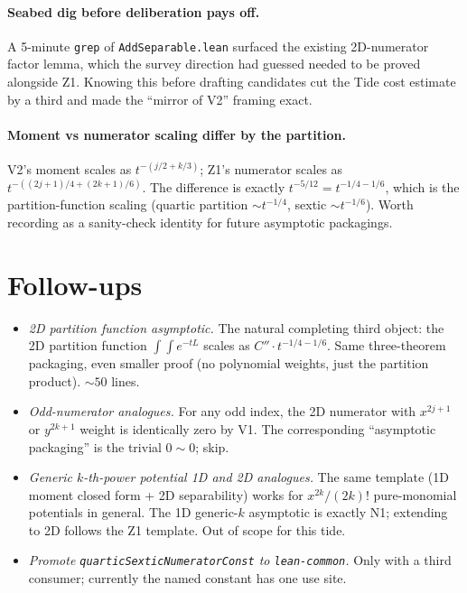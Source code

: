 \documentclass[11pt]{article}
\begin{document}
\paragraph{Seabed dig before deliberation pays off.} A 5-minute
\texttt{grep} of \texttt{AddSeparable.lean} surfaced the existing
2D-numerator factor lemma, which the survey direction had guessed
needed to be proved alongside Z1. Knowing this before drafting
candidates cut the Tide cost estimate by a third and made the
``mirror of V2'' framing exact.

\paragraph{Moment vs numerator scaling differ by the partition.}
V2's moment scales as $t^{-(j/2 + k/3)}$; Z1's numerator scales as
$t^{-((2j+1)/4 + (2k+1)/6)}$. The difference is exactly
$t^{-5/12} = t^{-1/4 - 1/6}$, which is the partition-function
scaling (quartic partition $\sim t^{-1/4}$, sextic
$\sim t^{-1/6}$). Worth recording as a sanity-check identity for
future asymptotic packagings.

\section{Follow-ups}

\begin{itemize}[leftmargin=1.5em]
\item \emph{2D partition function asymptotic.} The natural completing
  third object: the 2D partition function $\int\!\int e^{-tL}$ scales
  as $C''\cdot t^{-1/4 - 1/6}$. Same three-theorem packaging, even
  smaller proof (no polynomial weights, just the partition product).
  ${\sim}50$ lines.
\item \emph{Odd-numerator analogues.} For any odd index, the 2D
  numerator with $x^{2j+1}$ or $y^{2k+1}$ weight is identically zero
  by V1. The corresponding ``asymptotic packaging'' is the trivial
  $0 \sim 0$; skip.
\item \emph{Generic $k$-th-power potential 1D and 2D analogues.}
  The same template (1D moment closed form + 2D separability) works
  for $x^{2k}/(2k)!$ pure-monomial potentials in general. The 1D
  generic-$k$ asymptotic is exactly N1; extending to 2D follows the
  Z1 template. Out of scope for this tide.
\item \emph{Promote \texttt{quarticSexticNumeratorConst} to
  \texttt{lean-common}.} Only with a third consumer; currently the
  named constant has one use site.
\end{itemize}
\end{document}
